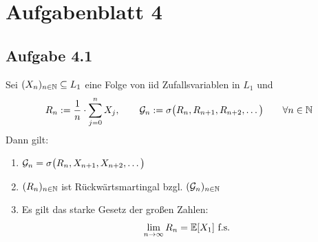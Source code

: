 
\section{Aufgabenblatt 4}
\subsection{Aufgabe 4.1}
Sei $(X_n)_{n\in\mathbb{N}}\subseteq L_1$ eine Folge von iid Zufallsvariablen in $L_1$ und 
\begin{align*}
	R_n:=\frac{1}{n}\cdot\sum\limits_{j=0}^n X_j,\qquad
	\mathcal{G}_n:=\sigma\big(R_n,R_{n+1},R_{n+2},\ldots\big)\qquad\forall n\in\mathbb{N}
\end{align*}
Dann gilt:
\begin{enumerate}[label=\alph*)]
	\item $\mathcal{G}_n=\sigma\big(R_n,X_{n+1},X_{n+2},\ldots\big)$
	\item $(R_n)_{n\in\mathbb{N}}$ ist Rückwärtsmartingal bzgl. $(\mathcal{G}_n)_{n\in\mathbb{N}}$
	\item Es gilt das starke Gesetz der großen Zahlen:
	\begin{align*}
		\lim\limits_{n\to\infty} R_n=\mathbb{E}[X_1]\text{ f.s.}
	\end{align*}
\end{enumerate}

